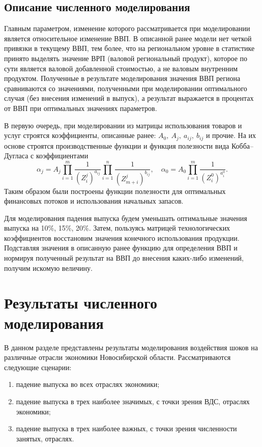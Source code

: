 \documentclass[12pt, a4paper]{article}
\begin{document}
\subsection{Описание численного моделирования}

Главным параметром, изменение которого рассматривается при моделировании является относительное изменение ВВП. В описанной ранее модели нет четкой привязки в текущему ВВП, тем более, что на региональном уровне в статистике принято выделять значение ВРП (валовой региональный продукт), которое по сути является валовой добавленной стоимостью, а не валовым внутренним продуктом. Полученные в результате моделирования значения ВВП региона сравниваются со значениями, полученными при моделировании оптимального случая (без внесения изменений в выпуск), а результат выражается в процентах от ВВП при оптимальных значениях параметров.

В первую очередь, при моделировании из матрицы использования товаров и услуг строятся коэффициенты, описанные ранее: $A_0,\ A_j,\ a_{ij},\ b_{ij}$ и прочие. На их основе строятся производственные функции и функция полезности вида Кобба--Дугласа с коэффициентами 
$$\alpha_j = A_j \prod\limits_{i=1}^{m} \dfrac{1}{(Z_i^j)^{a_{ij}}}\prod\limits_{i=1}^{n}\dfrac{1}{(Z_{m+i}^j)^{b_{ij}}},\quad \alpha_0 = A_0 \prod\limits_{i=1}^m\dfrac{1}{(Z_i^0)^{a_i^0}}.$$
Таким образом были построены функции полезности для оптимальных финансовых потоков и использования начальных запасов.

Для моделирования падения выпуска будем уменьшать оптимальные значения выпуска на 10\%, 15\%, 20\%. Затем, пользуясь матрицей технологических коэффициентов восстановим значения конечного использования продукции. Подставляя значения в описанную ранее функцию для определения ВВП и нормируя полученный результат на ВВП до внесения каких-либо изменений, получим искомую величину.
\section{Результаты численного моделирования}
В данном разделе представлены результаты моделирования воздействия шоков на различные отрасли экономики Новосибирской области. Рассматриваются следующие сценарии:
\begin{enumerate}
\item падение выпуска во всех отраслях экономики;
\item падение выпуска в трех наиболее значимых, с точки зрения ВДС, отраслях экономики;
\item падение выпуска в трех наиболее важных, с точки зрения численности занятых, отраслях.
\end{enumerate}
\end{document}

